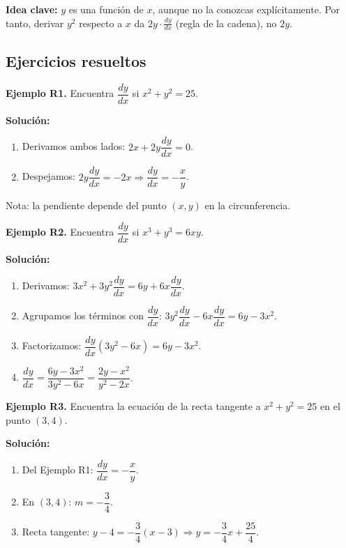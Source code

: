 \documentclass[12pt, letterpaper]{article}
\begin{document}
\begin{cuadroadvertencia}
  \textbf{Idea clave:} $y$ es una función de $x$, aunque no la conozcas explícitamente. Por tanto, derivar $y^2$ respecto a $x$ da $2y \cdot \frac{dy}{dx}$ (regla de la cadena), no $2y$.
\end{cuadroadvertencia}

\subsection{Ejercicios resueltos}

\textbf{Ejemplo R1.} Encuentra $\dfrac{dy}{dx}$ si $x^2 + y^2 = 25$.

\begin{cuadrosolucion}
  \textbf{Solución:}
  \begin{enumerate}
    \item Derivamos ambos lados: $2x + 2y\dfrac{dy}{dx} = 0$.
    \item Despejamos: $2y\dfrac{dy}{dx} = -2x \Rightarrow \dfrac{dy}{dx} = -\dfrac{x}{y}$.
  \end{enumerate}
  Nota: la pendiente depende del punto $(x, y)$ en la circunferencia.
\end{cuadrosolucion}

\newpage

\textbf{Ejemplo R2.} Encuentra $\dfrac{dy}{dx}$ si $x^3 + y^3 = 6xy$.

\begin{cuadrosolucion}
  \textbf{Solución:}
  \begin{enumerate}
    \item Derivamos: $3x^2 + 3y^2 \dfrac{dy}{dx} = 6y + 6x\dfrac{dy}{dx}$.
    \item Agrupamos los términos con $\dfrac{dy}{dx}$: $3y^2 \dfrac{dy}{dx} - 6x\dfrac{dy}{dx} = 6y - 3x^2$.
    \item Factorizamos: $\dfrac{dy}{dx}(3y^2 - 6x) = 6y - 3x^2$.
    \item $\dfrac{dy}{dx} = \dfrac{6y - 3x^2}{3y^2 - 6x} = \dfrac{2y - x^2}{y^2 - 2x}$.
  \end{enumerate}
\end{cuadrosolucion}

\textbf{Ejemplo R3.} Encuentra la ecuación de la recta tangente a $x^2 + y^2 = 25$ en el punto $(3, 4)$.

\begin{cuadrosolucion}
  \textbf{Solución:}
  \begin{enumerate}
    \item Del Ejemplo R1: $\dfrac{dy}{dx} = -\dfrac{x}{y}$.
    \item En $(3, 4)$: $m = -\dfrac{3}{4}$.
    \item Recta tangente: $y - 4 = -\dfrac{3}{4}(x - 3) \Rightarrow y = -\dfrac{3}{4}x + \dfrac{25}{4}$.
  \end{enumerate}
\end{cuadrosolucion}
\end{document}
